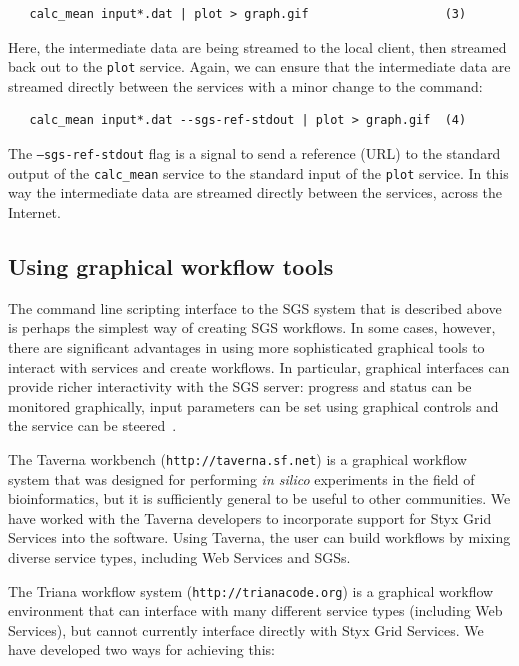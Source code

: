 \documentclass{llncs}
\begin{document}
\begin{verbatim}
   calc_mean input*.dat | plot > graph.gif                   (3)
\end{verbatim}

Here, the intermediate data are being streamed to the local client, then streamed back out to the {\tt plot} service.  Again, we can ensure that the intermediate data are streamed directly between the services with a minor change to the command:

\begin{verbatim}
   calc_mean input*.dat --sgs-ref-stdout | plot > graph.gif  (4)
\end{verbatim}

The {\tt --sgs-ref-stdout} flag is a signal to send a reference (URL) to the standard output of the {\tt calc\_mean} service to the standard input of the {\tt plot} service.  In this way the intermediate data are streamed directly between the services, across the Internet.

\subsection{Using graphical workflow tools}\label{subsec:graphical-workflow}
The command line scripting interface to the SGS system that is described above is perhaps the simplest way of creating SGS workflows.  In some cases, however, there are significant advantages in using more sophisticated graphical tools to interact with services and create workflows.  In particular, graphical interfaces can provide richer interactivity with the SGS server: progress and status can be monitored graphically, input parameters can be set using graphical controls and the service can be steered~\cite{blower:2005}.

The Taverna workbench ({\tt http://taverna.sf.net}) is a graphical workflow system that was designed for performing {\it in silico} experiments in the field of bioinformatics, but it is sufficiently general to be useful to other communities.  We have worked with the Taverna developers to incorporate support for Styx Grid Services into the software.  Using Taverna, the user can build workflows by mixing diverse service types, including Web Services and SGSs.

The Triana workflow system ({\tt http://trianacode.org}) is a graphical workflow environment that can interface with many different service types (including Web Services), but cannot currently interface directly with Styx Grid Services.  We have developed two ways for achieving this:
\end{document}
